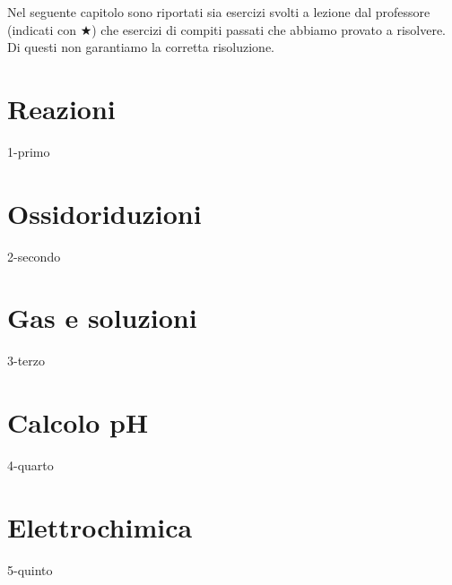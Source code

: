 \documentclass[12pt]{book}%
\begin{document}
Nel seguente capitolo sono riportati sia esercizi svolti a lezione dal professore (indicati con $\bigstar$) che esercizi di compiti passati che abbiamo provato a risolvere. Di questi non garantiamo la corretta risoluzione.

  \section{Reazioni}
    {1-primo}

    \newpage

  \section{Ossidoriduzioni}
    {2-secondo}

    \newpage

  \section{Gas e soluzioni}
    {3-terzo}

\newpage

  \section{Calcolo pH}
    {4-quarto}

  \newpage

  \section{Elettrochimica}
    {5-quinto}
\end{document}
